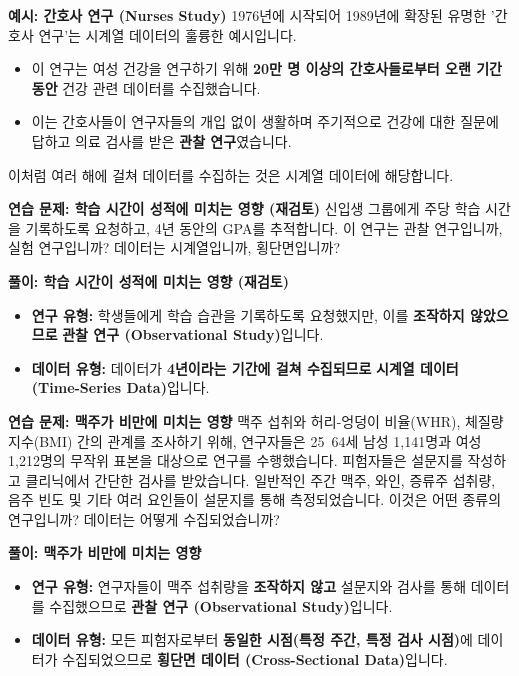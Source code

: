 \documentclass[11pt,a4paper]{book}
\newcommand{\concept}[1]{\textbf{#1}}
\theoremstyle{definition}
\begin{document}
\begin{examplebox}
\textbf{예시: 간호사 연구 (Nurses Study)}
1976년에 시작되어 1989년에 확장된 유명한 '간호사 연구'는 시계열 데이터의 훌륭한 예시입니다.
\begin{itemize}
    \item 이 연구는 여성 건강을 연구하기 위해 \textbf{20만 명 이상의 간호사들로부터 오랜 기간 동안} 건강 관련 데이터를 수집했습니다.
    \item 이는 간호사들이 연구자들의 개입 없이 생활하며 주기적으로 건강에 대한 질문에 답하고 의료 검사를 받은 \textbf{관찰 연구}였습니다.
\end{itemize}
이처럼 여러 해에 걸쳐 데이터를 수집하는 것은 시계열 데이터에 해당합니다.
\end{examplebox}

\begin{practicebox}
\textbf{연습 문제: 학습 시간이 성적에 미치는 영향 (재검토)}
신입생 그룹에게 주당 학습 시간을 기록하도록 요청하고, 4년 동안의 GPA를 추적합니다.
이 연구는 관찰 연구입니까, 실험 연구입니까? 데이터는 시계열입니까, 횡단면입니까?
\end{practicebox}

\begin{solutionbox}
\textbf{풀이: 학습 시간이 성적에 미치는 영향 (재검토)}
\begin{itemize}
    \item \textbf{연구 유형:} 학생들에게 학습 습관을 기록하도록 요청했지만, 이를 \textbf{조작하지 않았으므로} \concept{관찰 연구 (Observational Study)}입니다.
    \item \textbf{데이터 유형:} 데이터가 \textbf{4년이라는 기간에 걸쳐 수집되므로} \concept{시계열 데이터 (Time-Series Data)}입니다.
\end{itemize}
\end{solutionbox}

\begin{practicebox}
\textbf{연습 문제: 맥주가 비만에 미치는 영향}
맥주 섭취와 허리-엉덩이 비율(WHR), 체질량 지수(BMI) 간의 관계를 조사하기 위해, 연구자들은 25~64세 남성 1,141명과 여성 1,212명의 무작위 표본을 대상으로 연구를 수행했습니다. 피험자들은 설문지를 작성하고 클리닉에서 간단한 검사를 받았습니다. 일반적인 주간 맥주, 와인, 증류주 섭취량, 음주 빈도 및 기타 여러 요인들이 설문지를 통해 측정되었습니다.
이것은 어떤 종류의 연구입니까? 데이터는 어떻게 수집되었습니까?
\end{practicebox}

\begin{solutionbox}
\textbf{풀이: 맥주가 비만에 미치는 영향}
\begin{itemize}
    \item \textbf{연구 유형:} 연구자들이 맥주 섭취량을 \textbf{조작하지 않고} 설문지와 검사를 통해 데이터를 수집했으므로 \concept{관찰 연구 (Observational Study)}입니다.
    \item \textbf{데이터 유형:} 모든 피험자로부터 \textbf{동일한 시점(특정 주간, 특정 검사 시점)}에 데이터가 수집되었으므로 \concept{횡단면 데이터 (Cross-Sectional Data)}입니다.
\end{itemize}
\end{solutionbox}
\end{document}
